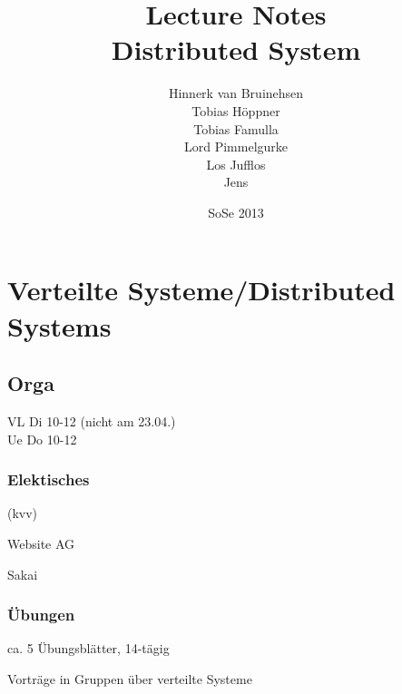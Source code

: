 \documentclass[ngerman,a4paper]{report}
\author{Hinnerk van Bruinehsen\\Tobias Höppner\\Tobias Famulla\\Lord Pimmelgurke\\Los Jufflos\\Jens\texttrademark}
\title{Lecture Notes\\\Huge{Distributed System}}
\date{SoSe 2013}
\begin{document}
\maketitle
\tableofcontents

\chapter{Verteilte Systeme/Distributed Systems}
\section{Orga}
VL Di 10-12 (nicht am 23.04.)\\
Ue Do 10-12\\

\subsection{Elektisches}
\begin{compactitem}
\item (kvv)
\item Website AG
\item Sakai
\end{compactitem}

\subsection{Übungen}

\begin{compactitem}
\item ca. 5 Übungsblätter, 14-tägig
\item Vorträge in Gruppen über \glqq verteilte Systeme\grqq
\end{compactitem}
\end{document}
